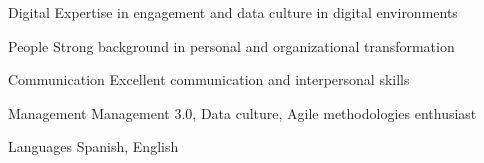 

\begin{cvskills}

  \cvskill
    {Digital} %
    {Expertise in engagement and data culture in digital environments} %

  \cvskill
    {People} %
    {Strong background in personal and organizational transformation} %

  \cvskill
    {Communication} %
    {Excellent communication and interpersonal skills} %

  \cvskill
    {Management} %
    {Management 3.0, Data culture, Agile methodologies enthusiast} %

  \cvskill
    {Languages} %
    {Spanish, English} %

\end{cvskills}
